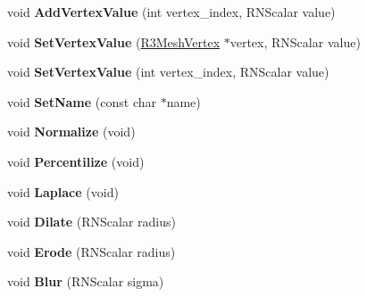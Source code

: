 \begin{DoxyCompactItemize}
\item 
void {\bfseries Add\+Vertex\+Value} (int vertex\+\_\+index, R\+N\+Scalar value)\hypertarget{struct_r3_mesh_property_afaaa972d0b6d3dff54f7cfd3c56f6fa1}{}\label{struct_r3_mesh_property_afaaa972d0b6d3dff54f7cfd3c56f6fa1}

\item 
void {\bfseries Set\+Vertex\+Value} (\hyperlink{class_r3_mesh_vertex}{R3\+Mesh\+Vertex} $\ast$vertex, R\+N\+Scalar value)\hypertarget{struct_r3_mesh_property_a0013d8da5d2e381cdabd096ac1207014}{}\label{struct_r3_mesh_property_a0013d8da5d2e381cdabd096ac1207014}

\item 
void {\bfseries Set\+Vertex\+Value} (int vertex\+\_\+index, R\+N\+Scalar value)\hypertarget{struct_r3_mesh_property_a3228b826e99a22761da2b70a4f932332}{}\label{struct_r3_mesh_property_a3228b826e99a22761da2b70a4f932332}

\item 
void {\bfseries Set\+Name} (const char $\ast$name)\hypertarget{struct_r3_mesh_property_a25612fcc0743299fa530d0ee1098a80e}{}\label{struct_r3_mesh_property_a25612fcc0743299fa530d0ee1098a80e}

\item 
void {\bfseries Normalize} (void)\hypertarget{struct_r3_mesh_property_a71304e17c3797008a4bd2264f7d1a12b}{}\label{struct_r3_mesh_property_a71304e17c3797008a4bd2264f7d1a12b}

\item 
void {\bfseries Percentilize} (void)\hypertarget{struct_r3_mesh_property_aee6215cee82729aaa8e5b78f34a978de}{}\label{struct_r3_mesh_property_aee6215cee82729aaa8e5b78f34a978de}

\item 
void {\bfseries Laplace} (void)\hypertarget{struct_r3_mesh_property_a1b87b847520b7d985497e710123257b9}{}\label{struct_r3_mesh_property_a1b87b847520b7d985497e710123257b9}

\item 
void {\bfseries Dilate} (R\+N\+Scalar radius)\hypertarget{struct_r3_mesh_property_ae680984a76a68331dbcfd8e31ed25efe}{}\label{struct_r3_mesh_property_ae680984a76a68331dbcfd8e31ed25efe}

\item 
void {\bfseries Erode} (R\+N\+Scalar radius)\hypertarget{struct_r3_mesh_property_a9effe5ed79d7b13124cbd1cbbfc31944}{}\label{struct_r3_mesh_property_a9effe5ed79d7b13124cbd1cbbfc31944}

\item 
void {\bfseries Blur} (R\+N\+Scalar sigma)\hypertarget{struct_r3_mesh_property_a612554fa16c083bb7fea9d510ec93beb}{}\label{struct_r3_mesh_property_a612554fa16c083bb7fea9d510ec93beb}


\end{DoxyCompactItemize}

